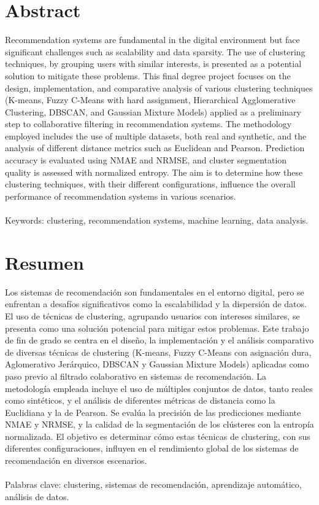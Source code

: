 \documentclass[a4paper,12pt]{report}
\begin{document}
\chapter*{Abstract}
Recommendation systems are fundamental in the digital environment but face significant challenges such as scalability and data sparsity. The use of clustering techniques, by grouping users with similar interests, is presented as a potential solution to mitigate these problems. This final degree project focuses on the design, implementation, and comparative analysis of various clustering techniques (K-means, Fuzzy C-Means with hard assignment, Hierarchical Agglomerative Clustering, DBSCAN, and Gaussian Mixture Models) applied as a preliminary step to collaborative filtering in recommendation systems. The methodology employed includes the use of multiple datasets, both real and synthetic, and the analysis of different distance metrics such as Euclidean and Pearson. Prediction accuracy is evaluated using NMAE and NRMSE, and cluster segmentation quality is assessed with normalized entropy. The aim is to determine how these clustering techniques, with their different configurations, influence the overall performance of recommendation systems in various scenarios.
\\
\\
Keywords: clustering, recommendation systems, machine learning, data analysis.

\clearpage %

\chapter*{Resumen}
Los sistemas de recomendación son fundamentales en el entorno digital, pero se enfrentan a desafíos significativos como la escalabilidad y la dispersión de datos. El uso de técnicas de clustering, agrupando usuarios con intereses similares, se presenta como una solución potencial para mitigar estos problemas. Este trabajo de fin de grado se centra en el diseño, la implementación y el análisis comparativo de diversas técnicas de clustering (K-means, Fuzzy C-Means con asignación dura, Aglomerativo Jerárquico, DBSCAN y Gaussian Mixture Models) aplicadas como paso previo al filtrado colaborativo en sistemas de recomendación. La metodología empleada incluye el uso de múltiples conjuntos de datos, tanto reales como sintéticos, y el análisis de diferentes métricas de distancia como la Euclidiana y la de Pearson. Se evalúa la precisión de las predicciones mediante NMAE y NRMSE, y la calidad de la segmentación de los clústeres con la entropía normalizada. El objetivo es determinar cómo estas técnicas de clustering, con sus diferentes configuraciones, influyen en el rendimiento global de los sistemas de recomendación en diversos escenarios.
\\
\\
Palabras clave: clustering, sistemas de recomendación, aprendizaje automático, análisis de datos.
\end{document}

